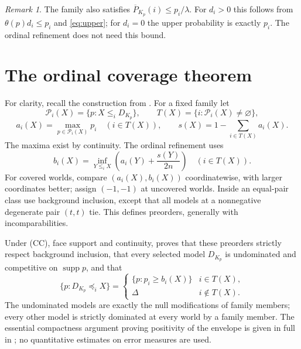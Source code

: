 \documentclass[11pt]{article}
\theoremstyle{remark}
\newtheorem{remark}[theorem]{Remark}
\newcommand{\supp}{\operatorname{supp}}
\newcommand{\hi}{\overline P}
\begin{document}
\begin{remark}
The family also satisfies $\hi_{K_p}(i)\le p_i/\lambda$. For $d_i>0$ this
follows from $\theta(p)d_i\le p_i$ and \eqref{eq:upper}; for $d_i=0$ the upper
probability is exactly $p_i$. The ordinal refinement does not need this bound.
\end{remark}

\section{The ordinal coverage theorem}

For clarity, recall the construction from \cite{OR}. For a fixed family let
\[
 \mathcal P_i(X)=\{p:X\le_iD_{K_p}\},\qquad
 T(X)=\{i:\mathcal P_i(X)\ne\varnothing\},
\]
\[
 a_i(X)=\max_{p\in\mathcal P_i(X)}p_i\quad(i\in T(X)),\qquad
 s(X)=1-\sum_{i\in T(X)}a_i(X).
\]
The maxima exist by continuity. The ordinal refinement uses
\[
 b_i(X)=\inf_{Y\le_iX}\left(a_i(Y)+\frac{s(Y)}{2n}\right)
 \quad(i\in T(X)).
 \tag{7}\label{eq:envelope}
\]
For covered worlds, compare $(a_i(X),b_i(X))$ coordinatewise, with larger
coordinates better; assign $(-1,-1)$ at uncovered worlds. Inside an equal-pair
class use background inclusion, except that all models at a nonnegative
degenerate pair $(t,t)$ tie. This defines preorders, generally with
incomparabilities.

Under (CC), face support and continuity, \cite[Theorem~4]{OR} proves that these
preorders strictly respect background inclusion, that every selected model
$D_{K_p}$ is undominated and competitive on $\supp p$, and that
\[
 \{p:D_{K_p}\preceq_iX\}=
 \begin{cases}
 \{p:p_i\ge b_i(X)\}&i\in T(X),\\
 \Delta&i\notin T(X).
 \end{cases}
 \tag{8}\label{eq:sections}
\]
The undominated models are exactly the null modifications of family members;
every other model is strictly dominated at every world by a family member.
The essential compactness argument proving positivity of the envelope is given
in full in \cite{OR}; no quantitative estimates on error measures are used.
\end{document}
